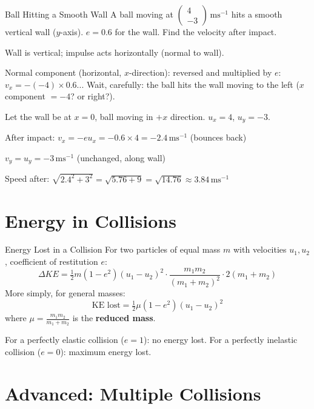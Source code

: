 \documentclass[12pt, a4paper]{book}
\newcommand{\ms}{\,\mathrm{ms}^{-1}}
\begin{document}
\begin{exmp}{Ball Hitting a Smooth Wall}{}
A ball moving at $\begin{pmatrix} 4 \\ -3 \end{pmatrix}\ms$ hits a smooth vertical wall ($y$-axis). $e = 0.6$ for the wall. Find the velocity after impact.

\medskip
Wall is vertical; impulse acts horizontally (normal to wall).

Normal component (horizontal, $x$-direction): reversed and multiplied by $e$: $v_x = -(-4) \times 0.6$... Wait, carefully: the ball hits the wall moving to the left ($x$ component $= -4$? or right?).

Let the wall be at $x = 0$, ball moving in $+x$ direction. $u_x = 4$, $u_y = -3$.

After impact: $v_x = -eu_x = -0.6 \times 4 = -2.4\ms$ (bounces back)

$v_y = u_y = -3\ms$ (unchanged, along wall)

Speed after: $\sqrt{2.4^2 + 3^2} = \sqrt{5.76 + 9} = \sqrt{14.76} \approx 3.84\ms$
\end{exmp}

\section{Energy in Collisions}

\begin{thm}{Energy Lost in a Collision}{}
For two particles of equal mass $m$ with velocities $u_1, u_2$, coefficient of restitution $e$:
\[
  \Delta KE = \tfrac{1}{2}m(1-e^2)(u_1-u_2)^2 \cdot \frac{m_1m_2}{(m_1+m_2)^2}\cdot 2(m_1+m_2)
\]
More simply, for general masses:
\[
  \text{KE lost} = \tfrac{1}{2}\mu(1-e^2)(u_1-u_2)^2
\]
where $\mu = \frac{m_1m_2}{m_1+m_2}$ is the \textbf{reduced mass}.

For a perfectly elastic collision ($e=1$): no energy lost.
For a perfectly inelastic collision ($e=0$): maximum energy lost.
\end{thm}

\section{Advanced: Multiple Collisions}
\end{document}

